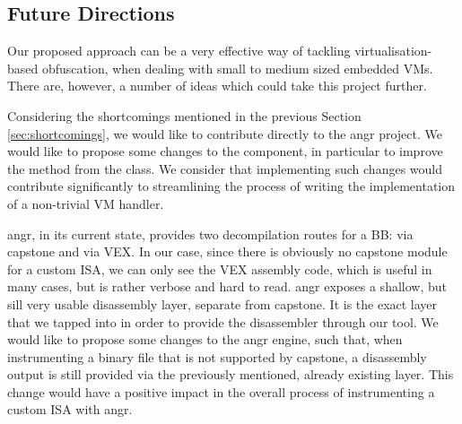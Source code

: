 \subsection{Future Directions}

Our proposed approach can be a very effective way of tackling virtualisation-based obfuscation, when dealing with small to medium sized embedded \glspl{VM}. There are, however, a number of ideas which could take this project further.

Considering the shortcomings mentioned in the previous Section \ref{sec:shortcomings}, we would like to contribute directly to the angr project. We would like to propose some changes to the  component, in particular to improve the  method from the  class. We consider that implementing such changes would contribute significantly to streamlining the process of writing the implementation of a non-trivial \gls{VM} handler.

angr, in its current state, provides two decompilation routes for a \gls{BB}: via capstone and via VEX. In our case, since there is obviously no capstone module for a custom \gls{ISA}, we can only see the VEX assembly code, which is useful in many cases, but is rather verbose and hard to read. angr exposes a shallow, but sill very usable disassembly layer, separate from capstone. It is the exact layer that we tapped into in order to provide the disassembler through our  tool. We would like to propose some changes to the angr engine, such that, when instrumenting a binary file that is not supported by capstone, a disassembly output is still provided via the previously mentioned, already existing layer. This change would have a positive impact in the overall process of instrumenting a custom \gls{ISA} with angr.

